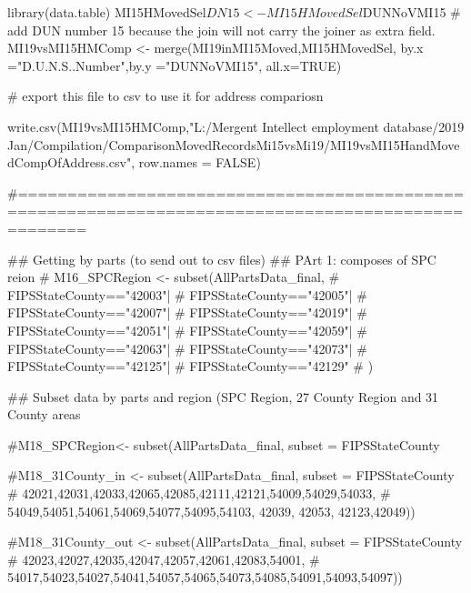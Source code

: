 library(data.table)
MI15HMovedSel$DN15 <-MI15HMovedSel$DUNNoVMI15 # add DUN number 15 because the join will not carry the joiner as extra field.
MI19vsMI15HMComp <- merge(MI19inMI15Moved,MI15HMovedSel, by.x ="D.U.N.S..Number",by.y ="DUNNoVMI15", all.x=TRUE)

# export this file to csv to use it for address compariosn

write.csv(MI19vsMI15HMComp,"L:/Mergent Intellect employment database/2019 Jan/Compilation/ComparisonMovedRecordsMi15vsMi19/MI19vsMI15HandMovedCompOfAddress.csv", row.names = FALSE)






#===================================================================================================


## Getting by parts (to send out to csv files)
## PArt 1: composes of SPC reion
# M16_SPCRegion <- subset(AllPartsData_final,
#             FIPSStateCounty=="42003"|
#             FIPSStateCounty=="42005"|
#             FIPSStateCounty=="42007"|
#             FIPSStateCounty=="42019"|
#             FIPSStateCounty=="42051"|
#             FIPSStateCounty=="42059"|
#             FIPSStateCounty=="42063"|
#             FIPSStateCounty=="42073"|
#             FIPSStateCounty=="42125"|
#             FIPSStateCounty=="42129"
#            )

## Subset data by parts and region (SPC Region, 27 County Region and 31 County areas

#M18_SPCRegion<- subset(AllPartsData_final, subset = FIPSStateCounty %

#M18_31County_in <- subset(AllPartsData_final, subset = FIPSStateCounty %
#                                                                           42021,42031,42033,42065,42085,42111,42121,54009,54029,54033,
#                                                                           54049,54051,54061,54069,54077,54095,54103, 42039, 42053, 42123,42049))

#M18_31County_out <- subset(AllPartsData_final, subset = FIPSStateCounty %
#                                                                          42023,42027,42035,42047,42057,42061,42083,54001,
#                                                                         54017,54023,54027,54041,54057,54065,54073,54085,54091,54093,54097))


